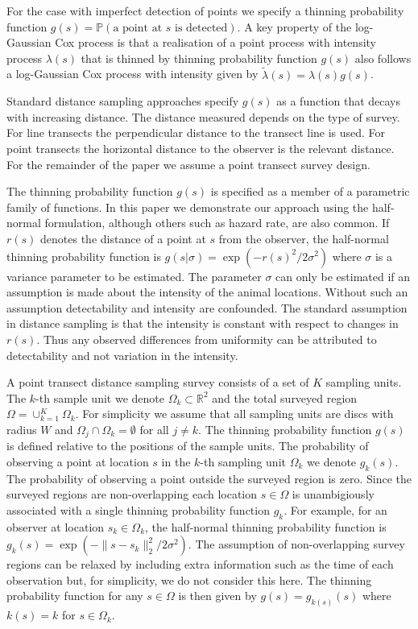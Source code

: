 \documentclass[preprint,12pt]{elsarticle}
\newcommand{\tl}{\tilde{\lambda}}   %
\begin{document}
\sloppy For the case with imperfect detection of points we specify a thinning probability function $g(s) = \mathbb{P}(\text{a point at $s$ is detected})$. A key property of the log-Gaussian Cox process is that a realisation of a point process with intensity process $\lambda(s)$ that is thinned by thinning probability function $g(s)$ also follows a log-Gaussian Cox process with intensity given by $\tl(s) = \lambda(s)g(s)$.

Standard distance sampling approaches specify $g(s)$ as a function that decays with increasing distance.  The distance measured depends on the type of survey.  For line transects the perpendicular distance to the transect line is used.  For point transects the horizontal distance to the observer is the relevant distance.  For the remainder of the paper we assume a point transect survey design.  

The thinning probability function $g(s)$ is specified as a member of a parametric family of functions.  In this paper we demonstrate our approach using the half-normal formulation, although others such as hazard rate, are also common.  If $r(s)$ denotes the distance of a point at $s$ from the observer, the half-normal thinning probability function is $g(s | \sigma) = \exp(-r(s)^2 / 2\sigma^2)$ where $\sigma$ is a variance parameter to be estimated.  The parameter $\sigma$ can only be estimated if an assumption is made about the intensity of the animal locations.  Without such an assumption detectability and intensity are confounded.  The standard assumption in distance sampling is that the intensity is constant with respect to changes in $r(s)$.  Thus any observed differences from uniformity can be attributed to detectability and not variation in the intensity.

A point transect distance sampling survey consists of a set of $K$ sampling units.  The $k$-th sample unit we denote $\Omega_k \subset \mathbb{R}^2$ and the total surveyed region $\Omega = \cup_{k=1}^K \Omega_k$.  For simplicity we assume that all sampling units are discs with radius $W$ and $\Omega_j \cap \Omega_k = \emptyset$ for all $j \neq k$.  The thinning probability function $g(s)$ is defined relative to the positions of the sample units.  The probability of observing a point at location $s$ in the $k$-th sampling unit $\Omega_k$ we denote $g_k(s)$.  The probability of observing a point outside the surveyed region is zero.
Since the surveyed regions are non-overlapping each location $s \in \Omega$ is unambigiously associated with a single thinning probability function $g_k$.  For example, for an observer at location $s_k \in \Omega_k$, the half-normal thinning probability function is $g_k(s) = \exp(-\lVert s - s_k \rVert_2^2 / 2\sigma^2)$. The assumption of non-overlapping survey regions can be relaxed by including extra information such as the time of each observation but, for simplicity, we do not consider this here.  The thinning probability function for any $s \in \Omega$ is then given by $g(s) = g_{k(s)}(s)$ where $k(s) = k$ for $s \in \Omega_k$.
\end{document}
